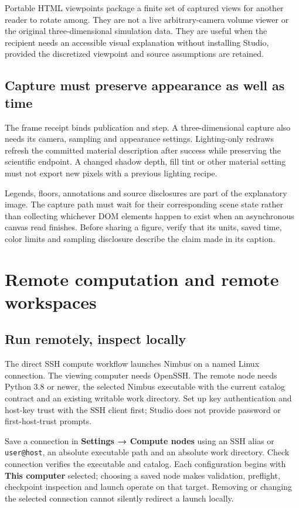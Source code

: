 Portable HTML viewpoints package a finite set of captured views for another
reader to rotate among. They are not a live arbitrary-camera volume viewer or
the original three-dimensional simulation data. They are useful when the
recipient needs an accessible visual explanation without installing Studio,
provided the discretized viewpoint and source assumptions are retained.

\subsection{Capture must preserve appearance as well as time}
The frame receipt binds publication and step. A three-dimensional capture also
needs its camera, sampling and appearance settings. Lighting-only redraws
refresh the committed material description after success while preserving the
scientific endpoint. A changed shadow depth, fill tint or other material setting
must not export new pixels with a previous lighting recipe.

Legends, floors, annotations and source disclosures are part of the explanatory
image. The capture path must wait for their corresponding scene state rather
than collecting whichever DOM elements happen to exist when an asynchronous
canvas read finishes. Before sharing a figure, verify that its units, saved
time, color limits and sampling disclosure describe the claim made in its caption.

\section{Remote computation and remote workspaces}
\subsection{Run remotely, inspect locally}
The direct SSH compute workflow launches Nimbus on a named Linux connection.
The viewing computer needs OpenSSH. The remote node needs Python 3.8 or newer,
the selected Nimbus executable with the current catalog contract and an existing
writable work directory. Set up key authentication and host-key trust with the
SSH client first; Studio does not provide password or first-host-trust prompts.

Save a connection in \textbf{Settings → Compute nodes} using an SSH alias or
\texttt{user@host}, an absolute executable path and an absolute work directory.
Check connection verifies the executable and catalog. Each configuration begins
with \textbf{This computer} selected; choosing a saved node makes validation,
preflight, checkpoint inspection and launch operate on that target. Removing or
changing the selected connection cannot silently redirect a launch locally.

